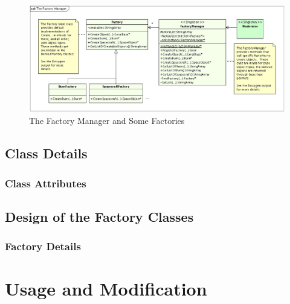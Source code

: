 \begin{figure}[htb]
\begin{center}
\includegraphics[scale=0.5]{Images/TheFactoryManager.eps}
\caption{The Factory Manager and Some Factories}
\label{figure:FactManClassDiagram}
\end{center}
\end{figure}



\subsection{Class Details}

\subsubsection{Class Attributes}

\subsection{\label{section:FactoryClassDesign}Design of the Factory Classes}

\subsubsection{Factory Details}


\section{Usage and Modification}

